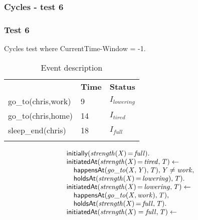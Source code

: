 \documentclass[8pt]{beamer}
\DeclareMathOperator{\val}{=}  %
\def \patsize {}
\def\happensAt{\textsf{\patsize happensAt}}
\def\initially{\textsf{\patsize initially}}
\def\holdsAt{\textsf{\patsize holdsAt}}
\def\initiatedAt{\textsf{\patsize initiatedAt}}
\newenvironment{mysplit}%
  {\arraycolsep 0pt \begin{array}{l}}%
  {\end{array}}
\begin{document}
\begin{frame}
    \frametitle{Cycles - test 6}
    \subsubsection{Test 6}
    \small
    Cycles test where CurrentTime-Window = -1.\linebreak
    \begin{minipage}{0.4\linewidth}
        \begin{table}[t!]
            \caption{Event description}
            \begin{center}

                \begin{tabular}{lll}
                    \hline\noalign{\smallskip}
                    \multicolumn{1}{l}{\textbf{Event}} & \multicolumn{1}{c}{\textbf{Time}} & \multicolumn{1}{c}{\textbf{Status}} \\
                    go\_to(chris,work)& 9 & $I_{lowering}$\\
                    go\_to(chris,home)& 14 & $I_{tired}$\\
                    sleep\_end(chris)& 18 & $I_{full}$\\
                    \noalign{\smallskip}
                    \hline
                \end{tabular}
            \end{center}
        \end{table}
    \end{minipage}
    \begin{minipage}{0.55\linewidth}
        \begin{align*}
            \begin{mysplit}
                \initially\mathit{(strength(X)\val full)}.\\
                \initiatedAt\mathit{(strength(X)\val tired,T)\leftarrow}\\
                \quad    \happensAt\mathit{(go\_to(X,Y),T),Y\neq work,}\\
                \quad    \holdsAt\mathit{(strength(X)\val lowering),T).}\\
                \initiatedAt\mathit{(strength(X)\val lowering,T)\leftarrow}\\
                \quad    \happensAt\mathit{(go\_to(X,work),T),}\\
                \quad    \holdsAt\mathit{(strength(X)\val full,T).}\\
                \initiatedAt\mathit{(strength(X)=full,T)\leftarrow}\\

\end{mysplit}
\end{align*}
\end{minipage}
\end{frame}
\end{document}
